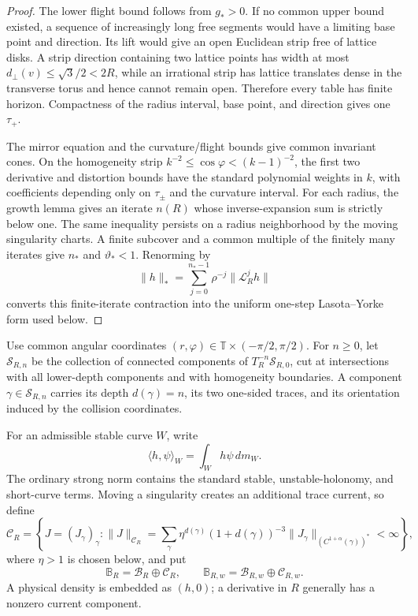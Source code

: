 \begin{proof}
The lower flight bound follows from \(g_*>0\).  If no common upper bound
existed, a sequence of increasingly long free segments would have a limiting
base point and direction.  Its lift would give an open Euclidean strip free of
lattice disks.  A strip direction containing two lattice points has width at
most \(d_\perp(v)\le\sqrt3/2<2R\), while an irrational strip has lattice
translates dense in the transverse torus and hence cannot remain open.
Therefore every table has finite horizon.  Compactness of the radius interval,
base point, and direction gives one \(\tau_+\).

The mirror equation and the curvature/flight bounds give common invariant
cones.  On the homogeneity strip
\(k^{-2}\le\cos\varphi<(k-1)^{-2}\), the first two derivative and distortion
bounds have the standard polynomial weights in \(k\), with coefficients
depending only on \(\tau_\pm\) and the curvature interval.  For each radius,
the growth lemma gives an iterate \(n(R)\) whose inverse-expansion sum is
strictly below one.  The same inequality persists on a radius neighborhood by
the moving singularity charts.  A finite subcover and a common multiple of
the finitely many iterates give \(n_*\) and \(\vartheta_*<1\).  Renorming by
\[
 \|h\|_*=
 \sum_{j=0}^{n_*-1}\rho^{-j}\|\mathcal L_R^jh\|
\]
converts this finite-iterate contraction into the uniform one-step
Lasota--Yorke form used below.
\end{proof}

Use common angular coordinates
\((r,\varphi)\in\mathbb T\times(-\pi/2,\pi/2)\).  For \(n\ge0\), let
\(\mathscr S_{R,n}\) be the collection of connected components of
\(T_R^{-n}\mathscr S_{R,0}\), cut at intersections with all lower-depth
components and with homogeneity boundaries.  A component
\(\gamma\in\mathscr S_{R,n}\) carries its depth \(d(\gamma)=n\), its two
one-sided traces, and its orientation induced by the collision coordinates.

For an admissible stable curve \(W\), write
\[
 \langle h,\psi\rangle_W=\int_Wh\psi\,dm_W.
\]
The ordinary strong norm contains the standard stable, unstable-holonomy, and
short-curve terms.  Moving a singularity creates an additional trace current,
so define
\[
 \mathcal C_R
 =\left\{J=(J_\gamma)_{\gamma}:
 \|J\|_{\mathcal C_R}
 =\sum_{\gamma}\eta^{d(\gamma)}
 (1+d(\gamma))^{-3}
 \|J_\gamma\|_{(C^{1+\alpha}(\gamma))^*}<\infty
 \right\},
\]
where \(\eta>1\) is chosen below, and put
\[
 \mathbb B_R=\mathcal B_R\oplus\mathcal C_R,
 \qquad
 \mathbb B_{R,w}=\mathcal B_{R,w}\oplus\mathcal C_{R,w}.
\]
A physical density is embedded as \((h,0)\); a derivative in \(R\) generally
has a nonzero current component.

